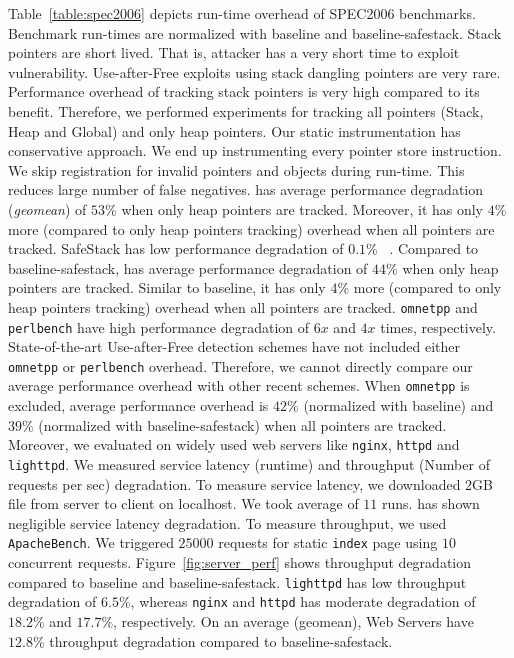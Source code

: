 
Table~\ref{table:spec2006} depicts run-time overhead of SPEC2006 benchmarks. Benchmark run-times are normalized with baseline and baseline-safestack. Stack pointers are short lived. That is, attacker has a very short time to exploit vulnerability. Use-after-Free exploits using stack dangling pointers are very rare. Performance overhead of tracking stack pointers is very high compared to its benefit. Therefore, we performed experiments for tracking all pointers (Stack, Heap and Global) and only heap pointers. Our static instrumentation has conservative approach. We end up instrumenting every pointer store instruction. We skip registration for invalid pointers and objects during run-time. This reduces large number of false negatives.  \projectname{} has average performance degradation (\textit{geomean}) of $53\%$ when only heap pointers are tracked. Moreover, it has only $4\%$ more (compared to only heap pointers tracking) overhead when all pointers are tracked. SafeStack has low performance degradation of $0.1\%$ ~\cite{kuznetsov2014code}. Compared to baseline-safestack, \projectname{} has average performance degradation of $44\%$ when only heap pointers are tracked. Similar to baseline, it has only $4\%$ more (compared to only heap pointers tracking) overhead when all pointers are tracked. \texttt{omnetpp} and \texttt{perlbench} have high performance degradation of $6x$ and $4x$ times, respectively. State-of-the-art Use-after-Free detection schemes have not included either \texttt{omnetpp} or \texttt{perlbench} overhead. Therefore, we cannot directly compare our average performance overhead with other recent schemes. When \texttt{omnetpp} is excluded, average performance overhead is $42\%$ (normalized with baseline) and $39\%$ (normalized with baseline-safestack) when all pointers are tracked. \\

Moreover, we evaluated \projectname{} on widely used web servers like \texttt{nginx}, \texttt{httpd} and \texttt{lighttpd}. We measured service latency (runtime) and throughput (Number of requests per sec) degradation. To measure service latency, we downloaded $2$GB file from server to client on localhost. We took average of $11$ runs. \projectname{} has shown negligible service latency degradation. To measure throughput, we used \texttt{ApacheBench}. We triggered $25000$ requests for static \texttt{index} page using $10$ concurrent requests. Figure~\ref{fig:server_perf} shows throughput degradation compared to baseline and baseline-safestack. \texttt{lighttpd} has low throughput degradation of $6.5\%$, whereas \texttt{nginx} and \texttt{httpd} has moderate degradation of $18.2\%$ and $17.7\%$, respectively. On an average (geomean), Web Servers have $12.8\%$ throughput degradation compared to baseline-safestack.     \\


